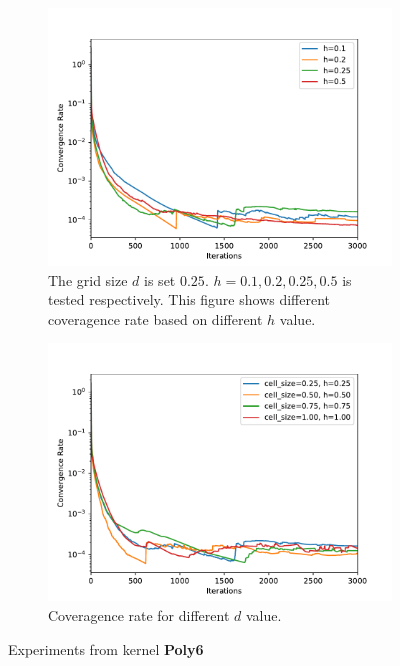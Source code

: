     \begin{figure}[!ht]
     \centering
    \begin{subfigure}[b]{0.7\textwidth}
        \includegraphics[width=\textwidth]{Figures/size25.pdf}
        \caption{The grid size $d$ is set $0.25$. $h=0.1, 0.2, 0.25, 0.5$ is tested respectively. This figure shows different coveragence rate based on different $h$ value.}
        \label{fig:dh}
    \end{subfigure}
    \begin{subfigure}[b]{0.7\textwidth}
        \includegraphics[width=\textwidth]{Figures/hd.pdf}
        \caption{Coveragence rate for different $d$ value.}
        \label{fig:testd}
    \end{subfigure}
    \caption{Experiments from kernel \textbf{Poly6}}
    \label{poly6}
    \end{figure}

